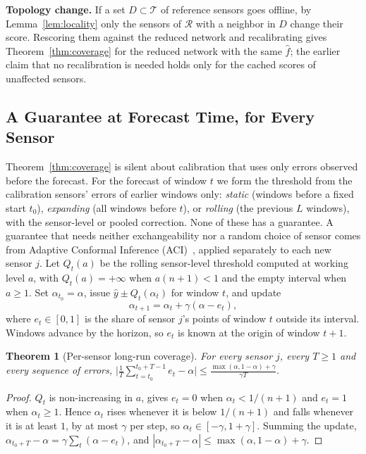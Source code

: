 \documentclass[journal,twoside,web]{ieeecolor}
\newtheorem{theorem}{Theorem}
\begin{document}
\textbf{Topology change.} If a set $D\subset\mathcal{T}$ of reference sensors goes offline, by
Lemma~\ref{lem:locality} only the sensors of $\mathcal{R}$ with a neighbor in $D$ change their score.
Rescoring them against the reduced network and recalibrating gives Theorem~\ref{thm:coverage} for the reduced
network with the same $\hat f$; the earlier claim that no recalibration is needed holds only for the cached
scores of unaffected sensors.

\subsection{A Guarantee at Forecast Time, for Every Sensor}
\label{sec:online-conformal}
Theorem~\ref{thm:coverage} is silent about calibration that uses only errors observed before the
forecast. For the forecast of window $t$ we form the threshold from the calibration sensors' errors of
earlier windows only: \emph{static} (windows before a fixed start $t_0$), \emph{expanding} (all windows
before $t$), or \emph{rolling} (the previous $L$ windows), with the sensor-level or pooled correction.
None of these has a guarantee. A guarantee that needs neither exchangeability nor a random choice of
sensor comes from Adaptive Conformal Inference (ACI)~\cite{gibbs2021aci}, applied separately to each new
sensor $j$. Let $Q_t(a)$ be the rolling sensor-level threshold computed at working level $a$, with
$Q_t(a)=+\infty$ when $a(n+1)<1$ and the empty interval when $a\ge 1$. Set $\alpha_{t_0}=\alpha$,
issue $\hat y\pm Q_t(\alpha_t)$ for window $t$, and update
\begin{equation}
\alpha_{t+1}=\alpha_t+\gamma(\alpha-e_t),
\end{equation}
where $e_t\in[0,1]$ is the share of sensor $j$'s points of window $t$ outside its interval. Windows
advance by the horizon, so $e_t$ is known at the origin of window $t+1$.

\begin{theorem}[Per-sensor long-run coverage]
\label{thm:aci}
For every sensor $j$, every $T\ge1$ and every sequence of errors,
$\big|\frac1T\sum_{t=t_0}^{t_0+T-1}e_t-\alpha\big|\le\frac{\max(\alpha,1-\alpha)+\gamma}{\gamma T}$.
\end{theorem}
\begin{proof}
$Q_t$ is non-increasing in $a$, gives $e_t=0$ when $\alpha_t<1/(n+1)$ and $e_t=1$ when $\alpha_t\ge1$. Hence
$\alpha_t$ rises whenever it is below $1/(n+1)$ and falls whenever it is at least $1$, by at most $\gamma$ per
step, so $\alpha_t\in[-\gamma,1+\gamma]$. Summing the update,
$\alpha_{t_0+T}-\alpha=\gamma\sum_t(\alpha-e_t)$, and $|\alpha_{t_0+T}-\alpha|\le\max(\alpha,1-\alpha)+\gamma$.
\end{proof}
\end{document}
